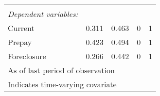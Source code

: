 \begin{tabular}{l*{1}{cccc}}
& & & & \\ 
 \emph{Dependent variables:} & & & \\ 
\hspace{5 mm}Current&       0.311&       0.463&           0&           1\\
\hspace{5 mm}Prepay &       0.423&       0.494&           0&           1\\
\hspace{5 mm}Foreclosure&       0.266&       0.442&           0&           1\\
\hline\hline
\multicolumn{5}{l}{\footnotesize As of last period of observation}\\
\multicolumn{5}{l}{\footnotesize * Indicates time-varying covariate}\\
\end{tabular}
